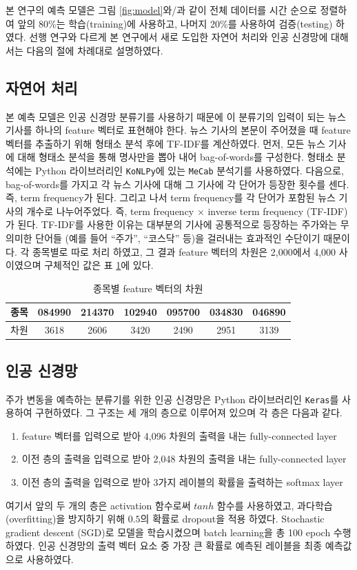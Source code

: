 \documentclass[a4paper,10pt]{article}
\begin{document}
본 연구의 예측 모델은 그림 \ref{fig:model}와/과 같이 전체 데이터를 시간 순으로 정렬하여
앞의 80\%는 학습(training)에 사용하고, 나머지 20\%를 사용하여 검증(testing) 하였다.
선행 연구와 다르게 본 연구에서 새로 도입한 자연어 처리와 인공 신경망에 대해서는 다음의 절에 차례대로 설명하였다.

\subsection{자연어 처리}

본 예측 모델은 인공 신경망 분류기를 사용하기 때문에 이 분류기의 입력이 되는 뉴스 기사를 하나의 feature 벡터로 표현해야 한다.
뉴스 기사의 본문이 주어졌을 때 feature 벡터를 추출하기 위해 형태소 분석 후에 TF-IDF를 계산하였다.
먼저, 모든 뉴스 기사에 대해 형태소 분석을 통해 명사만을 뽑아 내어 bag-of-words를 구성한다.
형태소 분석에는 Python 라이브러리인 \texttt{KoNLPy}에 있는 \texttt{MeCab} 분석기를 사용하였다.
다음으로, bag-of-words를 가지고 각 뉴스 기사에 대해 그 기사에 각 단어가 등장한 횟수를 센다.
즉, term frequency가 된다.
그리고 나서 term frequency를 각 단어가 포함된 뉴스 기사의 개수로 나누어주었다.
즉, term frequency $\times$ inverse term frequency (TF-IDF)가 된다.
TF-IDF를 사용한 이유는 대부분의 기사에 공통적으로 등장하는 주가와는 무의미한 단어들
(예를 들어 ``주가'', ``코스닥'' 등)을 걸러내는 효과적인 수단이기 때문이다.
각 종목별로 따로 처리 하였고, 그 결과 feature 벡터의 차원은 2,000에서 4,000 사이였으며 구체적인 값은 표 \ref{tbl:dimension}에 있다.
\begin{table}[h]
\begin{tabular}{|c||c|c|c|c|c|c|}
\hline
종목 & 084990 & 214370 & 102940 & 095700 & 034830 & 046890 \\
\hline
차원 & 3618 & 2606 & 3420 & 2490 & 2951 & 3139 \\
\hline
\end{tabular}
\centering
\caption{종목별 feature 벡터의 차원}
\label{tbl:dimension}
\end{table}

\subsection{인공 신경망}

주가 변동을 예측하는 분류기를 위한 인공 신경망은 Python 라이브러리인 \texttt{Keras}를 사용하여 구현하였다.
그 구조는 세 개의 층으로 이루어져 있으며 각 층은 다음과 같다.
\begin{enumerate}
\item feature 벡터를 입력으로 받아 4,096 차원의 출력을 내는 fully-connected layer
\item 이전 층의 출력을 입력으로 받아 2,048 차원의 출력을 내는 fully-connected layer
\item 이전 층의 출력을 입력으로 받아 3가지 레이블의 확률을 출력하는 softmax layer
\end{enumerate}
여기서 앞의 두 개의 층은 activation 함수로써 $tanh$ 함수를 사용하였고,
과다학습(overfitting)을 방지하기 위해 $0.5$의 확률로 dropout을 적용 하였다.
Stochastic gradient descent (SGD)로 모델을 학습시켰으며 batch learning을 총 100 epoch 수행하였다.
인공 신경망의 출력 벡터 요소 중 가장 큰 확률로 예측된 레이블을 최종 예측값으로 사용하였다.
\end{document}
